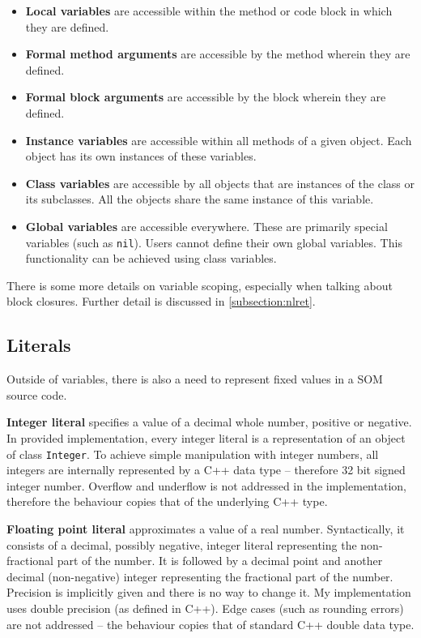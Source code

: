 \documentclass[thesis=M,english]{FITthesis}[2019/12/23]
\begin{document}
\begin{itemize}
	\item \textbf{Local variables} are accessible within the method or code block in which they are defined.
	\item \textbf{Formal method arguments} are accessible by the method wherein they are defined.
	\item \textbf{Formal block arguments} are accessible by the block wherein they are defined.
	\item \textbf{Instance variables} are accessible within all methods of a given object. Each object
		has its own instances of these variables.
	\item \textbf{Class variables} are accessible by all objects that are instances of the class or its
		subclasses. All the objects share the same instance of this variable.
	\item \textbf{Global variables} are accessible everywhere. These are primarily special variables
		(such as \texttt{nil}). Users cannot define their own global variables. This functionality can be
		achieved using class variables.
\end{itemize}

There is some more details on variable scoping, especially when talking about block closures. Further detail
is discussed in \ref{subsection:nlret}.

\subsection{Literals}
Outside of variables, there is also a need to represent fixed values in a SOM source code. 

\textbf{Integer literal} specifies a value of a decimal whole number, positive or negative.
In provided implementation, every integer literal is a representation of an object of class \texttt{Integer}. 
To achieve simple manipulation with integer numbers, all integers are internally represented by a C++
data type \texttt{} -- therefore 32 bit signed integer number. Overflow and underflow is not
addressed in the implementation, therefore the behaviour copies that of the underlying C++ type.

\textbf{Floating point literal} approximates a value of a real number. Syntactically, it consists of
a decimal, possibly negative, integer literal representing the non-fractional part of the number. It is
followed by a decimal point and another decimal (non-negative) integer representing the fractional part
of the number. Precision is implicitly given and there is no way to change it. My implementation uses
double precision (as defined in C++). Edge cases (such as rounding errors) are not addressed -- the behaviour
copies that of standard C++ double data type.
\end{document}
